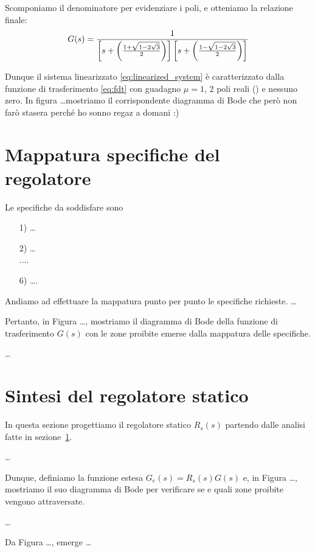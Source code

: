 \documentclass[a4paper, 11pt]{article}
\begin{document}
Scomponiamo il denominatore per evidenziare i poli, e otteniamo la relazione finale:
\begin{align}\label{eq:fdt}
	G(s) = \frac{1}{\left[ s + \left( \frac{1+\sqrt{1-2\sqrt{3}}}{2} \right) \right]\left[ s + \left( \frac{1-\sqrt{1-2\sqrt{3}}}{2} \right) \right]}
\end{align}

Dunque il sistema linearizzato \eqref{eq:linearized_system} è caratterizzato dalla funzione di trasferimento \eqref{eq:fdt} con guadagno $\mu=1$, 2 poli reali () e nessuno zero. In figura \dots mostriamo il corrispondente diagramma di Bode che però non farò stasera perché ho sonno regaz a domani :)


\section{Mappatura specifiche del regolatore}
\label{sec:specifications}

Le specifiche da soddisfare sono
\begin{itemize}
	\item[1)] \dots\\
	\item[2)] \dots\\
	....\\
	\item[6)] \dots.
\end{itemize}
%
Andiamo ad effettuare la mappatura punto per punto le specifiche richieste. \dots  

Pertanto, in Figura \dots, mostriamo il diagramma di Bode della funzione di trasferimento $G(s)$ con le zone proibite emerse dalla mappatura delle specifiche.

\dots

\section{Sintesi del regolatore statico}
\label{sec:static_regulator}

In questa sezione progettiamo il regolatore statico $R_s(s)$ partendo dalle analisi fatte in sezione~\ref{sec:specifications}.

\dots

Dunque, definiamo la funzione estesa $G_e(s) = R_s(s)G(s)$ e, in Figura \dots, mostriamo il suo diagramma di Bode per verificare se e quali zone proibite vengono attraversate.

\dots

Da Figura \dots, emerge \dots
\end{document}
